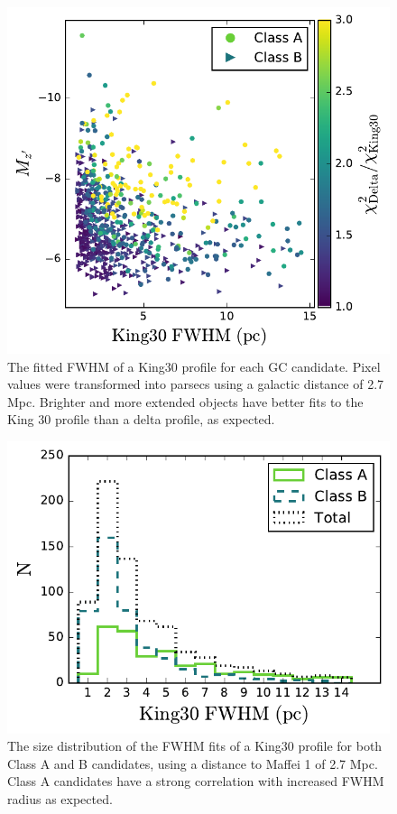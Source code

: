 \documentclass[useAMS,usenatbib]{mn2e}
\begin{document}
\begin{figure}
	\includegraphics[width=\columnwidth]{images/kingFWHM.pdf}
	\caption{The fitted FWHM of a King30 profile for each GC candidate. Pixel values were transformed into parsecs using a galactic distance of 2.7 Mpc. Brighter and more extended objects have better fits to the King 30 profile than a delta profile, as expected.}
	\label{fig:kfwhm}
\end{figure}
\begin{figure}
	\includegraphics[width=\columnwidth]{images/sizeHist.pdf}
	\caption{The size distribution of the FWHM fits of a King30 profile for both Class A and B candidates, using a distance to Maffei 1 of 2.7 Mpc. Class A candidates have a strong correlation with increased FWHM radius as expected.}
	\label{fig:kfwhmHist}
\end{figure}
\lipsum[1-2]
\end{document}
